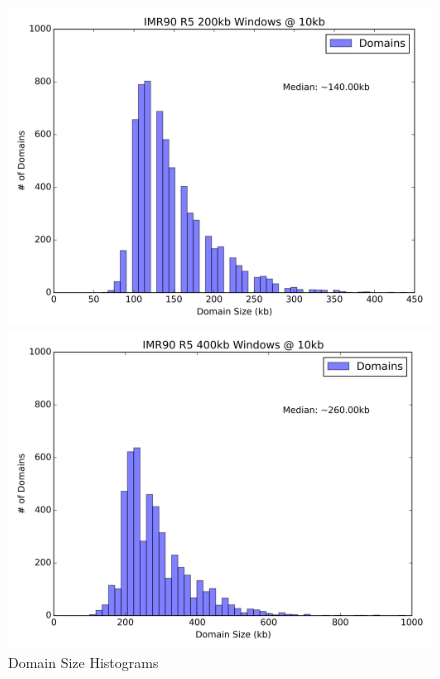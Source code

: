 \begin{figure}[H]
  \caption{Domain Size Histograms}
  \begin{minipage}{0.5\textwidth}%
    \includegraphics[width=\textwidth]{./figures/supplementary/domains/size200kb.png}
  \end{minipage}%
  \hfill
  \begin{minipage}{0.5\textwidth}
    \includegraphics[width=\textwidth]{./figures/supplementary/domains/size400kb.png}
  \end{minipage}%

  \vfill


\end{figure}
